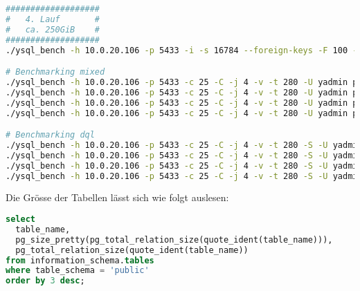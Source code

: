 \begin{flushleft}
\begin{lstlisting}[language=bash, caption=YugabyteDB - Benchmarking-Commands,captionpos=b,label={lst:yugabytedb-benchmarking-commands},breaklines=true]
###################
#   4. Lauf       #
#   ca. 250GiB    #
###################
./ysql_bench -h 10.0.20.106 -p 5433 -i -s 16784 --foreign-keys -F 100 -I dtgvpf --index-tablespace=eval_index_tablespace --tablespace=eval_data_tablespace -U yadmin pgbench_eval_bench

# Benchmarking mixed
./ysql_bench -h 10.0.20.106 -p 5433 -c 25 -C -j 4 -v -t 280 -U yadmin pgbench_eval_bench > /home/gramic/4_1_yugabytedb_mixed_benchmark.txt
./ysql_bench -h 10.0.20.106 -p 5433 -c 25 -C -j 4 -v -t 280 -U yadmin pgbench_eval_bench > /home/gramic/4_2_yugabytedb_mixed_benchmark.txt
./ysql_bench -h 10.0.20.106 -p 5433 -c 25 -C -j 4 -v -t 280 -U yadmin pgbench_eval_bench > /home/gramic/4_3_yugabytedb_mixed_benchmark.txt
./ysql_bench -h 10.0.20.106 -p 5433 -c 25 -C -j 4 -v -t 280 -U yadmin pgbench_eval_bench > /home/gramic/4_4_yugabytedb_mixed_benchmark.txt

# Benchmarking dql
./ysql_bench -h 10.0.20.106 -p 5433 -c 25 -C -j 4 -v -t 280 -S -U yadmin pgbench_eval_bench > /home/gramic/4_1_yugabytedb_dql_benchmark.txt
./ysql_bench -h 10.0.20.106 -p 5433 -c 25 -C -j 4 -v -t 280 -S -U yadmin pgbench_eval_bench > /home/gramic/4_2_yugabytedb_dql_benchmark.txt
./ysql_bench -h 10.0.20.106 -p 5433 -c 25 -C -j 4 -v -t 280 -S -U yadmin pgbench_eval_bench > /home/gramic/4_3_yugabytedb_dql_benchmark.txt
./ysql_bench -h 10.0.20.106 -p 5433 -c 25 -C -j 4 -v -t 280 -S -U yadmin pgbench_eval_bench > /home/gramic/4_4_yugabytedb_dql_benchmark.txt
\end{lstlisting}
\end{flushleft}
\begin{flushleft}
    Die Grösse der Tabellen lässt sich wie folgt auslesen:
\lstset{style=gra_codestyle}
\begin{lstlisting}[language=sql, caption=yugabyteDB - Benchmarking - Table Size SQL,captionpos=b,label={lst:yugabytedb-benchmarking-table-size-sql},breaklines=true]
select
  table_name,
  pg_size_pretty(pg_total_relation_size(quote_ident(table_name))),
  pg_total_relation_size(quote_ident(table_name))
from information_schema.tables
where table_schema = 'public'
order by 3 desc;
\end{lstlisting}
\end{flushleft}